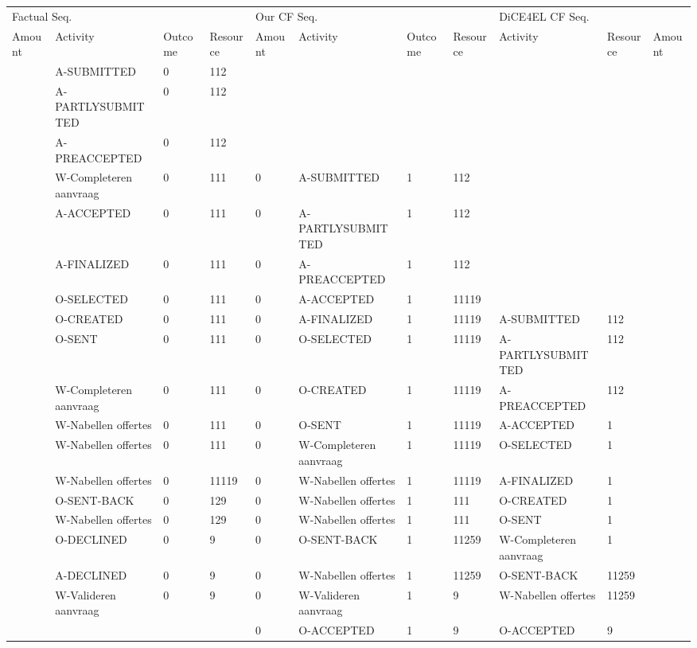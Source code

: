 \begin{tabular}{lllllllllll}
\toprule
\multicolumn{4}{l}{Factual Seq.} & \multicolumn{4}{l}{Our CF Seq.} & \multicolumn{3}{l}{DiCE4EL CF Seq.} \\
Amount & Activity & Outcome & Resource & Amount & Activity & Outcome & Resource & Activity & Resource & Amount \\
\midrule
 & A-SUBMITTED & 0 & 112 &  &  &  &  &  &  &  \\
 & A-PARTLYSUBMITTED & 0 & 112 &  &  &  &  &  &  &  \\
 & A-PREACCEPTED & 0 & 112 &  &  &  &  &  &  &  \\
 & W-Completeren aanvraag & 0 & 111 & 0 & A-SUBMITTED & 1 & 112 &  &  &  \\
 & A-ACCEPTED & 0 & 111 & 0 & A-PARTLYSUBMITTED & 1 & 112 &  &  &  \\
 & A-FINALIZED & 0 & 111 & 0 & A-PREACCEPTED & 1 & 112 &  &  &  \\
 & O-SELECTED & 0 & 111 & 0 & A-ACCEPTED & 1 & 11119 &  &  &  \\
 & O-CREATED & 0 & 111 & 0 & A-FINALIZED & 1 & 11119 & A-SUBMITTED & 112 &  \\
 & O-SENT & 0 & 111 & 0 & O-SELECTED & 1 & 11119 & A-PARTLYSUBMITTED & 112 &  \\
 & W-Completeren aanvraag & 0 & 111 & 0 & O-CREATED & 1 & 11119 & A-PREACCEPTED & 112 &  \\
 & W-Nabellen offertes & 0 & 111 & 0 & O-SENT & 1 & 11119 & A-ACCEPTED & 1 &  \\
 & W-Nabellen offertes & 0 & 111 & 0 & W-Completeren aanvraag & 1 & 11119 & O-SELECTED & 1 &  \\
 & W-Nabellen offertes & 0 & 11119 & 0 & W-Nabellen offertes & 1 & 11119 & A-FINALIZED & 1 &  \\
 & O-SENT-BACK & 0 & 129 & 0 & W-Nabellen offertes & 1 & 111 & O-CREATED & 1 &  \\
 & W-Nabellen offertes & 0 & 129 & 0 & W-Nabellen offertes & 1 & 111 & O-SENT & 1 &  \\
 & O-DECLINED & 0 & 9 & 0 & O-SENT-BACK & 1 & 11259 & W-Completeren aanvraag & 1 &  \\
 & A-DECLINED & 0 & 9 & 0 & W-Nabellen offertes & 1 & 11259 & O-SENT-BACK & 11259 &  \\
 & W-Valideren aanvraag & 0 & 9 & 0 & W-Valideren aanvraag & 1 & 9 & W-Nabellen offertes & 11259 &  \\
 &  &  &  & 0 & O-ACCEPTED & 1 & 9 & O-ACCEPTED & 9 &  \\
\bottomrule
\end{tabular}
